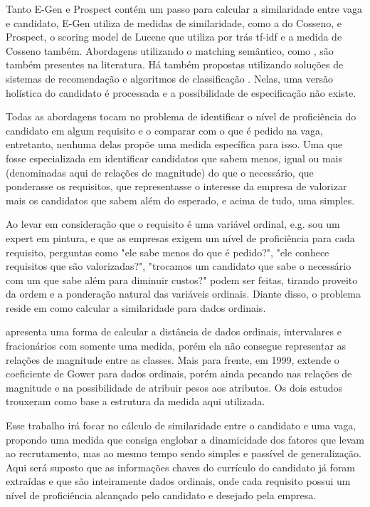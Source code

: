 \documentclass[preprint,12pt]{elsarticle}
\begin{document}
Tanto E-Gen e Prospect contém um passo para calcular a similaridade entre vaga e candidato, E-Gen utiliza de medidas de similaridade, como a do Cosseno, e Prospect, o scoring model de Lucene que utiliza por trás tf-idf e a medida de Cosseno também. Abordagens utilizando o matching semântico, como \cite{impact-semantic-web-2005}, são também presentes na literatura. Há também propostas utilizando soluções de sistemas de recomendação \cite{needle-haystack-recommender-systems} e algoritmos de classificação \cite{poch-etal-2014-ranking}. Nelas, uma versão holística do candidato é processada e a possibilidade de especificação não existe.

Todas as abordagens tocam no problema de identificar o nível de proficiência do candidato em algum requisito e o comparar com o que é pedido na vaga, entretanto, nenhuma delas propõe uma medida específica para isso. Uma que fosse especializada em identificar candidatos que sabem menos, igual ou mais (denominadas aqui de relações de magnitude) do que o necessário, que ponderasse os requisitos, que representasse o interesse da empresa de valorizar mais os candidatos que sabem além do esperado, e acima de tudo, uma simples.

Ao levar em consideração que o requisito é uma variável ordinal, e.g. sou um expert em pintura, e que as empresas exigem um nível de proficiência para cada requisito, perguntas como "ele sabe menos do que é pedido?", "ele conhece requisitos que são valorizadas?", "trocamos um candidato que sabe o necessário com um que sabe além para diminuir custos?" podem ser feitas, tirando proveito da ordem e a ponderação natural das variáveis ordinais. Diante disso, o problema reside em como calcular a similaridade para dados ordinais.

\cite{analysis-cluster} apresenta uma forma de calcular a distância de dados ordinais, intervalares e fracionários com somente uma medida, porém ela não consegue representar as relações de magnitude entre as classes. Mais para frente, em 1999, \cite{analysis-cluster} extende o coeficiente de Gower para dados ordinais, porém ainda pecando nas relações de magnitude e na possibilidade de atribuir pesos aos atributos. Os dois estudos trouxeram como base a estrutura da medida aqui utilizada.

Esse trabalho irá focar no cálculo de similaridade entre o candidato e uma vaga, propondo uma medida que consiga englobar a dinamicidade dos fatores que levam ao recrutamento, mas ao mesmo tempo sendo simples e passível de generalização. Aqui será suposto que as informações chaves do currículo do candidato já foram extraídas e que são inteiramente dados ordinais, onde cada requisito possui um nível de proficiência alcançado pelo candidato e desejado pela empresa.
\end{document}
